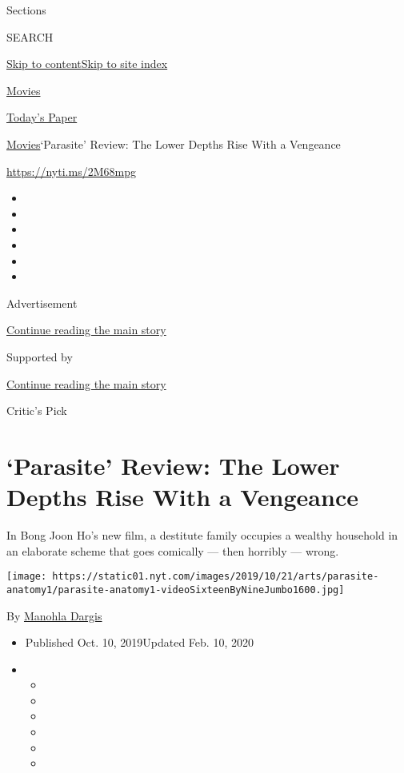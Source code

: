 Sections

SEARCH

\protect\hyperlink{site-content}{Skip to
content}\protect\hyperlink{site-index}{Skip to site index}

\href{https://www.nytimes.com/section/movies}{Movies}

\href{https://myaccount.nytimes.com/auth/login?response_type=cookie\&client_id=vi}{}

\href{https://www.nytimes.com/section/todayspaper}{Today's Paper}

\href{/section/movies}{Movies}\textbar{}`Parasite' Review: The Lower
Depths Rise With a Vengeance

\href{https://nyti.ms/2M68mpg}{https://nyti.ms/2M68mpg}

\begin{itemize}
\item
\item
\item
\item
\item
\item
\end{itemize}

Advertisement

\protect\hyperlink{after-top}{Continue reading the main story}

Supported by

\protect\hyperlink{after-sponsor}{Continue reading the main story}

Critic's Pick

\hypertarget{parasite-review-the-lower-depths-rise-with-a-vengeance}{%
\section{`Parasite' Review: The Lower Depths Rise With a
Vengeance}\label{parasite-review-the-lower-depths-rise-with-a-vengeance}}

In Bong Joon Ho's new film, a destitute family occupies a wealthy
household in an elaborate scheme that goes comically --- then horribly
--- wrong.

\texttt{[image: https://static01.nyt.com/images/2019/10/21/arts/parasite-anatomy1/parasite-anatomy1-videoSixteenByNineJumbo1600.jpg]}

By \href{https://www.nytimes.com/by/manohla-dargis}{Manohla Dargis}

\begin{itemize}
\item
  Published Oct. 10, 2019Updated Feb. 10, 2020
\item
  \begin{itemize}
  \item
  \item
  \item
  \item
  \item
  \item
  \end{itemize}
\end{itemize}


